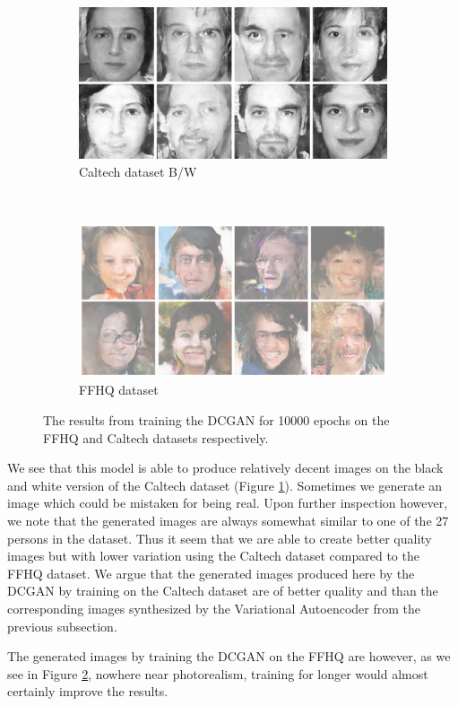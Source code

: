 \begin{figure}[h!]
    \centering
    \begin{subfigure}[b]{0.45\textwidth}
        \includegraphics[width=\textwidth]{fig/dcgan/caltech/epoch10000}
        \caption{Caltech dataset B/W}
        \label{dcgan-caltech}
    \end{subfigure}
    ~
    \begin{subfigure}[b]{0.45\textwidth}
        \includegraphics[width=\textwidth]{fig/dcgan/ffhq/epoch10000}
        \caption{FFHQ dataset}
        \label{dcgan-ffhq}
    \end{subfigure}
    \caption{The results from training the DCGAN for 10000 epochs on the FFHQ and Caltech datasets respectively.}
    \label{dcgan-results}
\end{figure}

We see that this model is able to produce relatively decent images on the black and white version of the Caltech dataset (Figure \ref{dcgan-caltech}). Sometimes we generate an image which could be mistaken for being real. Upon further inspection however, we note that the generated images are always somewhat similar to one of the 27 persons in the dataset. Thus it seem that we are able to create better quality images but with lower variation using the Caltech dataset compared to the FFHQ dataset. We argue that the generated images produced here by the DCGAN by training on the Caltech dataset are of better quality and than the corresponding images synthesized by the Variational Autoencoder from the previous subsection.

The generated images by training the DCGAN on the FFHQ are however, as we see in Figure \ref{dcgan-ffhq}, nowhere near photorealism, training for longer would almost certainly improve the results. 
